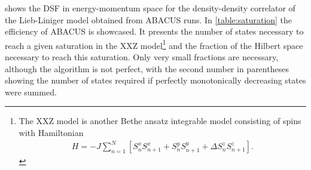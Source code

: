 \documentclass[11pt, a4paper]{report} %
\begin{document}
 shows the DSF in energy-momentum space for the density-density correlator of the Lieb-Liniger model obtained from ABACUS runs.
In \cref{table:saturation} the efficiency of ABACUS is showcased.
It presents the number of states necessary to reach a given saturation in the XXZ model\footnote{The XXZ model is another Bethe ansatz integrable model consisting of spins with Hamiltonian~\cite{Franchini2017}
    \begin{align}
      \label{eq:53}
      H = - J \sum_{n=1}^N\left[S_{n}^xS_{n+1}^x+S_n^yS_{n+1}^y + \Delta S_n^zS_{n+1}^z\right].
    \end{align}
} and the fraction of the Hilbert space necessary to reach this saturation.
Only very small fractions are necessary, although the algorithm is not perfect, with the second number in parentheses showing the number of states required if perfectly monotonically decreasing states were summed.
\end{document}

